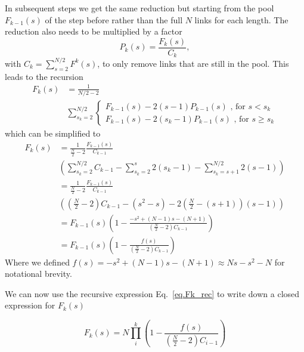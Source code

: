 \documentclass[
reprint,
twocolumn,
amsmath,amssymb,superscriptaddress,aps,
pre]{revtex4-1}
\begin{document}
In subsequent steps we get the same reduction but starting from the pool $F_{k-1}(s)$ of the step before rather than the full $N$ links for each length. The reduction also needs to be multiplied by a factor 
\begin{equation}
    P_k(s)=\frac{F_k(s)}{C_k},
    \label{eq.Pk}
\end{equation}
with $C_k=\sum_{s=2}^{N/2}F^k(s)$, to only remove links that are still in the pool. This leads to the recursion
\begin{align}
    F_k(s)&= \frac{1}{N/2-2} \nonumber \\
    &\sum_{s_k=2}^{N/2} {\begin{cases}
     F_{k-1}(s)-2(s-1) P_{k-1}(s) \text{ , for } s<s_k\\
     F_{k-1}(s)-2(s_k -1)P_{k-1}(s)\text{ , for } s\geq s_k
    \end{cases}}
\end{align}
which can be simplified to
\begin{align}
   F_k(s)&= \frac{1}{\frac{N}{2}-2} \frac{F_{k-1}(s)}{C_{k-1}}\nonumber \\
   &\left( \sum_{s_k=2}^{N/2}C_{k-1} - \sum_{s_k=2}^{s} 2(s_k-1) - \sum_{s_k=s+1}^{N/2} 2(s -1) \right) \nonumber \\
   &= \frac{1}{\frac{N}{2}-2}\frac{F_{k-1}(s)}{C_{k-1}}\nonumber \\
   &\left(\left(\frac{N}{2}-2\right)C_{k-1} -(s^2-s)
   -2\left(\frac{N}{2}-(s+1)\right)(s-1)\right)  \nonumber \\
   &= F_{k-1}(s)\left(1-\frac{-s^2 +(N-1)s-(N+1)}{(\frac{N}{2}-2)C_{k-1}} \right)\nonumber \\
   &=F_{k-1}(s)\left(1-\frac{f(s)}{(\frac{N}{2}-2)C_{k-1}} \right)
   \label{eq.Fk_rec}
\end{align}
Where we defined $f(s)=-s^2 +(N-1)s-(N+1) \approx N s - s^2 - N$ for notational brevity.

We can now use the recursive expression Eq.~\ref{eq.Fk_rec} to write down a closed expression for $F_k(s)$

\begin{equation}
    F_k(s)=N\prod_{i}^k\left(1-\frac{f(s)}{(\frac{N}{2}-2)C_{i-1}} \right)
\end{equation}
\end{document}

